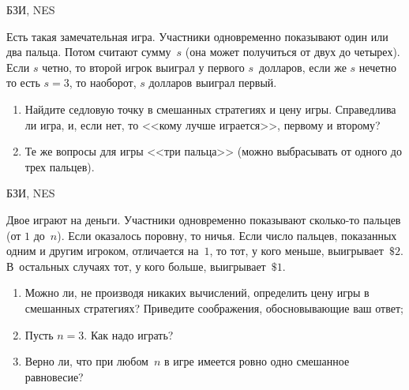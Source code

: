 \begin{problem}
\begin{source}
БЗИ, NES
\end{source}
 Есть такая замечательная игра.
Участники одновременно показывают один или два пальца.
Потом считают сумму~$s$ (она может получиться от двух до
четырех). Если $s$ четно, то второй игрок выиграл у первого
$s$~долларов, если же $s$ нечетно то есть $s=3$, то наоборот, $s$ долларов выиграл
первый.

\begin{enumerate}

\item Найдите седловую точку в смешанных стратегиях и цену
игры. Справедлива ли игра, и, если нет, то <<кому лучше играется>>, первому и второму?

\item Те же вопросы для игры <<три пальца>> (можно
выбрасывать от одного до трех пальцев).

\end{enumerate}



\begin{sol}

\end{sol}
\end{problem}




\begin{problem}
\begin{source}
БЗИ, NES
\end{source} Двое играют на
деньги. Участники одновременно показывают сколько-то
пальцев (от $1$ до~$n$). Если оказалось поровну, то ничья.
Если число пальцев, показанных одним и другим игроком,
отличается на~$1$, то тот, у кого меньше, выигрывает~$\$2$.
В~остальных случаях тот, у кого больше, выигрывает~$\$1$.

\begin{enumerate}

\item Можно ли, не производя никаких вычислений, определить
цену игры в смешанных стратегиях? Приведите соображения,
обосновывающие ваш ответ;

\item Пусть $n=3$. Как надо играть?

\item Верно ли, что при любом~$n$ в игре имеется ровно одно
смешанное равновесие?

\end{enumerate}

\begin{sol}

\end{sol}
\end{problem}





